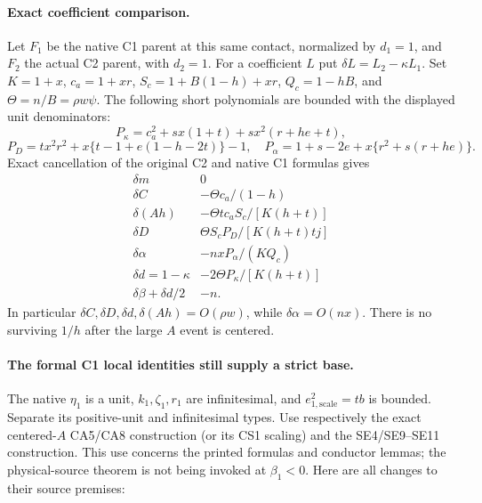 \paragraph{Exact coefficient comparison.}
Let $F_1$ be the native C1 parent at this same contact, normalized by
$d_1=1$, and $F_2$ the actual C2 parent, with $d_2=1$.
For a coefficient $L$ put $\delta L=L_2-\kappa L_1$.
Set $K=1+x$, $c_a=1+xr$, $S_c=1+B(1-h)+xr$, $Q_c=1-hB$,
and $\Theta=n/B=\rho w\psi$. The following short polynomials are
bounded with the displayed unit denominators:
\[
 P_\kappa=c_a^2+sx(1+t)+sx^2(r+he+t),
\]
\[
 P_D=tx^2r^2+x\{t-1+e(1-h-2t)\}-1,\quad
 P_\alpha=1+s-2e+x\{r^2+s(r+he)\}.
\]
Exact cancellation of the original C2 and native C1 formulas gives
\[
\begin{array}{c|l}
 \delta m&0\\
 \delta C&-\Theta c_a/(1-h)\\
 \delta(Ah)&-\Theta t c_aS_c/[K(h+t)]\\
 \delta D&\Theta S_cP_D/[K(h+t)tj]\\
 \delta\alpha&-nxP_\alpha/(KQ_c)\\
 \delta d=1-\kappa&-2\Theta P_\kappa/[K(h+t)]\\
 \delta\beta+\delta d/2&-n.
\end{array}
\tag{TL3}
\]
In particular $\delta C,\delta D,\delta d,\delta(Ah)=O(\rho w)$,
while $\delta\alpha=O(nx)$. There is no surviving $1/h$ after the
large $A$ event is centered.

\paragraph{The formal C1 local identities still supply a strict base.}
The native $\eta_1$ is a unit, $k_1,\zeta_1,r_1$ are infinitesimal,
and $e_{1,\mathrm{scale}}^2=tb$ is bounded. Separate its positive-unit
and infinitesimal types. Use respectively the exact centered-$A$
CA5/CA8 construction (or its CS1 scaling) and the SE4/SE9--SE11
construction. This use concerns the printed formulas and conductor
lemmas; the physical-source theorem is not being invoked at $\beta_1<0$.
Here are all changes to their source premises:

